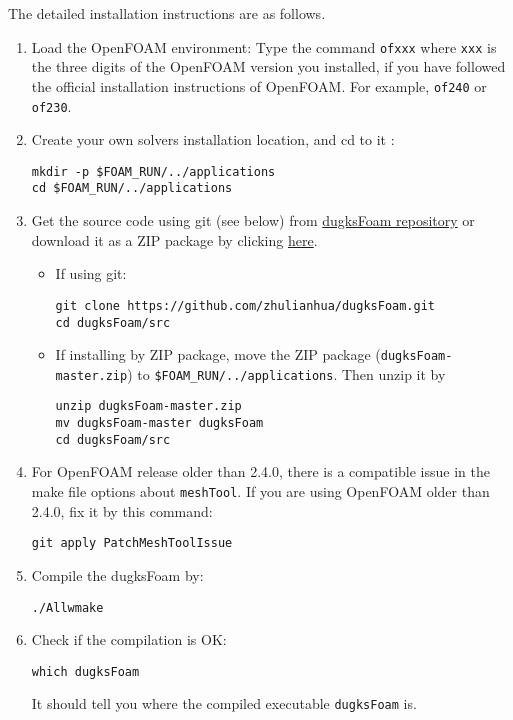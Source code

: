 The detailed installation instructions are as follows.
\begin{enumerate}
\item Load the OpenFOAM environment:
Type the command \texttt{ofxxx} where \texttt{xxx} is the three digits of the OpenFOAM version you installed,
if you have followed the official installation instructions of OpenFOAM. For example, \texttt{of240} or \texttt{of230}.
\item Create your own solvers installation location, and cd to it :
\begin{verbatim}
mkdir -p $FOAM_RUN/../applications
cd $FOAM_RUN/../applications
\end{verbatim}
\item Get the source code using git (see below) from \href{https://github.com/zhulianhua/dugksFoam}{dugksFoam repository}
or download it as a ZIP package by clicking \href{https://github.com/zhulianhua/dugksFoam/archive/master.zip}{here}.
\begin{itemize}
\item If using git:
\begin{verbatim}
git clone https://github.com/zhulianhua/dugksFoam.git
cd dugksFoam/src
\end{verbatim}
\item If installing by ZIP package, move the ZIP package (\texttt{dugksFoam-master.zip}) to \verb|$FOAM_RUN/../applications|. Then unzip it by
\begin{verbatim}
unzip dugksFoam-master.zip
mv dugksFoam-master dugksFoam
cd dugksFoam/src
\end{verbatim}
\end{itemize}

\item For OpenFOAM release older than 2.4.0, there is a compatible issue in the make file options about \verb|meshTool|.
If you are using OpenFOAM older than 2.4.0, fix it by this command:
\begin{verbatim}
git apply PatchMeshToolIssue
\end{verbatim}

\item Compile the dugksFoam by:
\begin{verbatim}
./Allwmake
\end{verbatim}

\item Check if the compilation is OK:
\begin{verbatim}
which dugksFoam
\end{verbatim}
It should tell you where the compiled executable \verb|dugksFoam| is.
\end{enumerate}
%

